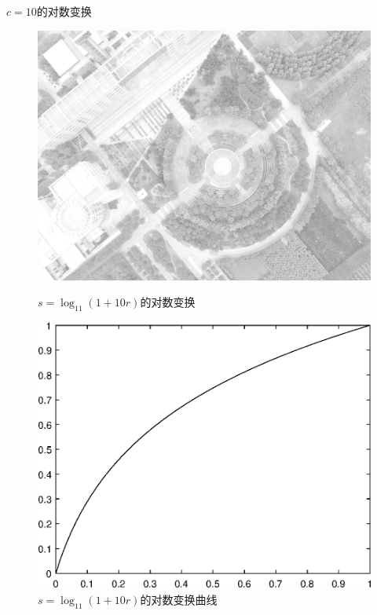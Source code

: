 $c=10$的对数变换
\begin{figure}[H]
	\centering
	\begin{minipage}{0.45\linewidth}
		\includegraphics[width=\linewidth]{figure/DJI_0027_Log_1000.png}
		\caption{$s=\log_{11}(1+10r)$的对数变换}
	\end{minipage}
	\begin{minipage}{0.45\linewidth}
		\includegraphics[width=\linewidth]{figure/DJI_0027_Log_1000_Graph.eps}
		\caption{$s=\log_{11}(1+10r)$的对数变换曲线}
	\end{minipage}
\end{figure}

